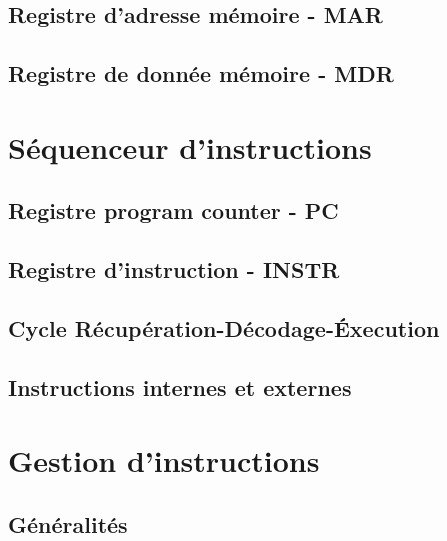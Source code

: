 \documentclass{scrreprt}
\begin{document}
    	\section{Registre d'adresse mémoire - MAR}
    	
    	\section{Registre de donnée mémoire - MDR}
    	
    \chapter{Séquenceur d'instructions}
    
    	\section{Registre program counter - PC}
    	
    	\section{Registre d'instruction - INSTR}
    	
    	\section{Cycle Récupération-Décodage-Éxecution}
    	
    	\section{Instructions internes et externes}
    	
    \chapter{Gestion d'instructions}
    	
    	\section{Généralités}
    	
\end{document}
